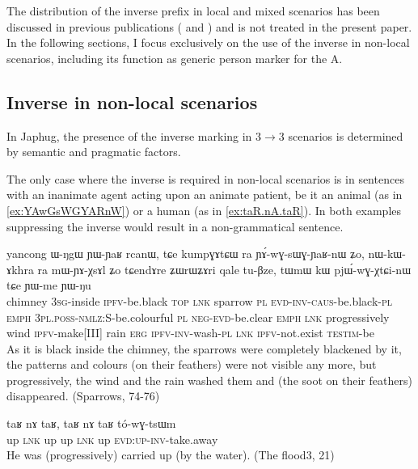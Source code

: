 \documentclass[oldfontcommands,oneside,a4paper,11pt]{article}
\newcommand{\ipa}[1]{{\phon \mbox{#1}}} %
\begin{document}
The distribution of the inverse prefix in local and mixed scenarios has been discussed in previous publications (\citealt{jacques10inverse} and \citealt{jacques14inverse}) and is not treated in the present paper. In the following sections, I focus exclusively on the use of the inverse in non-local scenarios, including its function as generic person marker for the A.

\subsection{Inverse in non-local scenarios} \label{sec:obv.jpg}
In Japhug, the presence of the inverse marking in  3$\rightarrow$3 scenarios is determined by semantic and pragmatic factors. 

The only case where the inverse is required in non-local scenarios is in sentences with an inanimate agent acting upon an animate patient, be it an animal (as in \ref{ex:YAwGsWGYARnW}) or a human (as in \ref{ex:taR.nA.taR}). In both examples suppressing the inverse would result in a non-grammatical sentence.  
 

 \begin{exe}
\ex \label{ex:YAwGsWGYARnW} 
\gll
yancong	\ipa{ɯ-ŋgɯ} 	\ipa{ɲɯ-ɲaʁ} 	\ipa{rcanɯ,} 	\ipa{tɕe} 	\ipa{kumpɣɤtɕɯ} 	\ipa{ra} 	\ipa{ɲɤ́-wɣ-sɯɣ-ɲaʁ-nɯ} 	\ipa{ʑo,} 	\ipa{nɯ-kɯ-ɤkhra} 	\ipa{ra} 	\ipa{mɯ-ɲɤ-χsɤl} 	\ipa{ʑo} 	\ipa{tɕendɤre} 	\ipa{ʑɯrɯʑɤri} 	\ipa{qale} 	\ipa{tu-βze,} 	\ipa{tɯmɯ} 	\ipa{kɯ} 	\ipa{pjɯ́-wɣ-χtɕi-nɯ} 	\ipa{tɕe} 	\ipa{ɲɯ-me} 	\ipa{ɲɯ-ŋu} \\
chimney \textsc{3sg}-inside \textsc{ipfv}-be.black \textsc{top} \textsc{lnk} sparrow \textsc{pl} \textsc{evd-inv-caus}-be.black-\textsc{pl} \textsc{emph} \textsc{3pl.poss-nmlz}:S-be.colourful \textsc{pl} \textsc{neg-evd}-be.clear \textsc{emph} \textsc{lnk} progressively wind \textsc{ipfv}-make[III] rain \textsc{erg} \textsc{ipfv-inv}-wash-\textsc{pl} \textsc{lnk} \textsc{ipfv}-not.exist \textsc{testim}-be \\
\glt As it is black inside the chimney, the sparrows were completely blackened by it, the patterns and colours (on their feathers) were not visible any more, but progressively, the wind and the rain washed them and (the soot on their feathers) disappeared.
 (Sparrows, 74-76)
\end{exe}

 \begin{exe}
\ex \label{ex:taR.nA.taR} 
\gll
\ipa{taʁ}   	\ipa{nɤ}   	\ipa{taʁ,}   	\ipa{taʁ}   	\ipa{nɤ}   	\ipa{taʁ}   	\ipa{tó-wɣ-tsɯm}   \\
up \textsc{lnk} up up \textsc{lnk} up \textsc{evd:up-inv-}take.away \\
\glt He was (progressively)  carried up (by the water). (The flood3, 21)
\end{exe}
\end{document}
